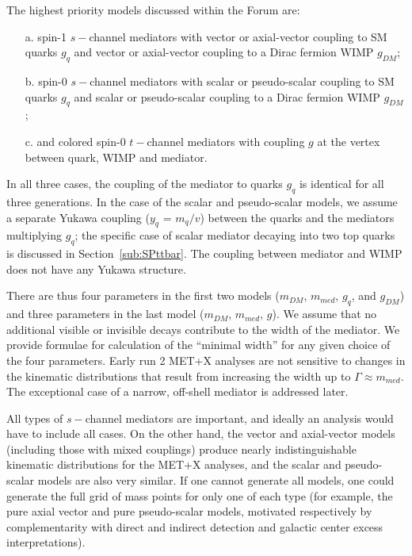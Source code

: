 \documentclass[a4,debug,notitlepage,nobib]{tufte-handout}
\newcommand{\mdm}{\ensuremath{m_{DM}}\xspace}
\newcommand{\mmed}{\ensuremath{m_{med}}\xspace}
\newcommand{\gq}{\ensuremath{g_{q}}\xspace}
\newcommand{\gdm}{\ensuremath{g_{DM}}\xspace}
\begin{document}
The highest priority models discussed within the Forum are:
\begin{itemize}
\item[a.] spin-1 $s-$channel mediators with vector or 
  axial-vector coupling to SM quarks \gq
  and vector or axial-vector coupling to a Dirac fermion WIMP \gdm;
\item[b.] spin-0 $s-$channel mediators with scalar or 
  pseudo-scalar coupling to SM quarks \gq and scalar or pseudo-scalar
  coupling to a Dirac fermion WIMP \gdm;
\item[c.] and colored spin-0 $t-$channel mediators with 
  coupling $g$ at the vertex between quark, WIMP 
  and mediator. 
\end{itemize}

In all three cases, the coupling of the mediator to quarks \gq is
identical for all three generations. 
In the case of the scalar and pseudo-scalar models, we assume a separate 
Yukawa coupling ($y_q$ = $m_q/v$) between the quarks and the mediators
multiplying \gq; the specific case of scalar mediator decaying
into two top quarks is discussed in Section~\ref{sub:SPttbar}. The
coupling between mediator and WIMP does not have any Yukawa structure.

There are thus four parameters in the first two
models (\mdm, \mmed, \gq, and \gdm) and three parameters
in the last model (\mdm, \mmed, $g$). We assume that no
additional visible or invisible decays contribute to the width of the
mediator. We provide formulae for calculation of the ``minimal
width'' for any given choice of the four parameters. Early run 2 MET+X
analyses are not sensitive to changes in the kinematic distributions that 
result from increasing the width up to $\Gamma \approx \mmed$. 
The exceptional case of a narrow, off-shell mediator is addressed later.

All types of $s-$channel mediators are important, and ideally an analysis 
would have to include all cases. On the other hand, the vector and axial-vector models 
(including those with mixed couplings) produce nearly indistinguishable kinematic distributions 
for the MET+X analyses, and the scalar and pseudo-scalar models are also very similar. 
If one cannot generate all models, one could generate the full grid of mass points for only one of each 
type (for example, the pure axial vector and pure pseudo-scalar models, motivated
respectively by complementarity with direct and indirect detection and galactic center excess 
interpretations). 
\end{document}
